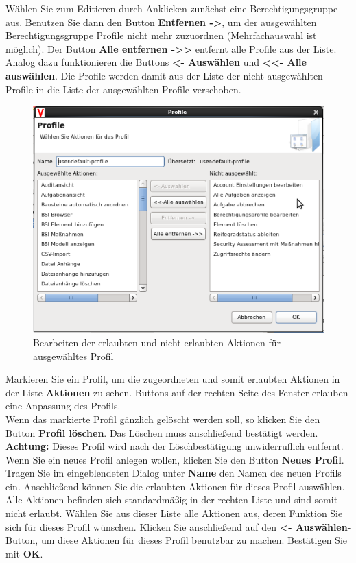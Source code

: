 \documentclass[a4paper,10pt]{book}
\begin{document}
Wählen Sie zum Editieren durch Anklicken zunächst eine Berechtigungsgruppe aus. Benutzen Sie dann den Button \textbf{Entfernen -\textgreater}, um der
ausgewählten Berechtigungsgruppe Profile nicht mehr zuzuordnen (Mehrfachauswahl ist möglich). Der Button \textbf{Alle entfernen -\textgreater\textgreater} entfernt alle
Profile aus der Liste. Analog dazu funktionieren die Buttons \textbf{\textless- Auswählen} und \textbf{\textless\textless- Alle auswählen}. Die Profile werden damit aus der
Liste der nicht ausgewählten Profile in die Liste der ausgewählten Profile verschoben.
\newline
\begin{figure}[htb!]
  \centering
  \includegraphics[scale=.65]{Screenshot/Berechtigungsprofil_bearbeiten.png}
  \caption{\label{Bearbeiten der erlaubten und nicht erlaubten Aktionen fuer ausgewaehltes Profil} Bearbeiten der erlaubten und nicht erlaubten Aktionen für ausgewähltes Profil}
\end{figure}
\newline
Markieren Sie ein Profil, um die zugeordneten und somit erlaubten Aktionen in der Liste \textbf{Aktionen} zu sehen.
Buttons auf der rechten Seite des Fenster erlauben eine Anpassung des Profils.
\newline\\
Wenn das markierte Profil gänzlich gelöscht werden soll, so klicken Sie den Button \textbf{Profil löschen}. Das Löschen muss anschließend
bestätigt werden. \textbf{Achtung:} Dieses Profil wird nach der Löschbestätigung unwiderruflich entfernt.
\newline\\
Wenn Sie ein neues Profil anlegen wollen, klicken Sie den Button \textbf{Neues Profil}. Tragen Sie im eingeblendeten Dialog unter \textbf{Name} den
Namen des neuen Profils ein. Anschließend können Sie die erlaubten Aktionen für dieses Profil auswählen. Alle Aktionen befinden sich standardmäßig
in der rechten Liste und sind somit nicht erlaubt. Wählen Sie aus dieser Liste alle Aktionen aus, deren Funktion Sie sich für dieses Profil wünschen.
Klicken Sie anschließend auf den \textbf{\textless- Auswählen}-Button, um diese Aktionen für dieses Profil benutzbar zu machen. Bestätigen Sie mit \textbf{OK}.
\end{document}
